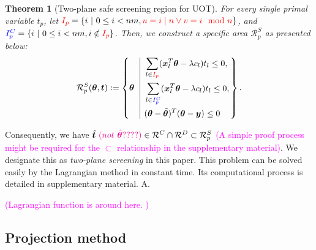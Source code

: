 \documentclass[twoside]{article}
\theoremstyle{plain}
\newtheorem{thm}{Theorem}
\renewcommand{\vec}[1]{\bm{#1}}
\newcommand{\changeHK}[1]{\textcolor{red}{#1}}
\newcommand{\changeXS}[1]{\textcolor{blue}{#1}}
\newcommand{\note}[1]{\textcolor{magenta}{#1}}
\begin{document}
\begin{thm}[Two-plane safe screening region for UOT]
\label{Thm:AreaScreeningUOT}
For every single primal variable $t_p$, let $\changeHK{I_p} = \{ i \ | \  0\leq i<nm, \changeHK{u = i\mid n \vee v = i\mod n}\}$, and $\changeXS{{I}^{C}_p} = \{ i \ | \  0\leq i<nm, i \notin \changeHK{I_p}\}$. Then, we construct a specific area $\mathcal{R}^{S}_{p}$ as presented below:
\changeXS{
\begin{equation}
\label{Eq:FinalRS}
\begin{split} 
\mathcal{R}^S_{p}(\vec{\theta}, \vec{t}):= \left\{\vec{\theta} \ \left|\ 
\begin{aligned}
 &\sum_{l\in \changeHK{I_p}}(\vec{x}_{l}^{T}\vec{\theta} - \lambda {c}_l)t_l\leq 0, \\
 &\sum_{l\in \changeXS{{I}^{C}_p}}(\vec{x}_{l} ^{T}\vec{\theta}- \lambda {c}_l)t_l\leq 0, \\
  &(\vec{\theta}-\tilde{\vec{\theta}})^T(\vec{\theta}-\vec{y})\leq 0
\end{aligned}
\right.
\right\}.
\end{split}
\end{equation}
}

\end{thm}

Consequently, we have $\hat{\vec{t}} \note{\ (not\ \hat{\vec{\theta}}????)} \in \mathcal{R}^{C}\cap\mathcal{R}^{D} \subset \mathcal{R}^{S}_{p}$ \note{(A simple proof process might be required for the $\subset$ relationship in the supplementary material)}.
We designate this as {\it two-plane screening} in this paper. This problem can be solved easily by the Lagrangian method in constant time. Its computational process is detailed in supplementary material. A.


\note{(Lagrangian function is around here. )}

\subsection{Projection method}
\end{document}

